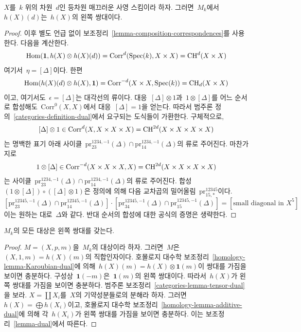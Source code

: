 \begin{lemma}
\label{lemma-dual}
$X$를\  $k$ 위의 차원\  $d$인 등차원 매끄러운 사영 스킴이라 하자.
그러면\  $M_k$에서\  $h(X)(d)$는\  $h(X)$의 왼쪽 쌍대이다.
\end{lemma}

\begin{proof}
이후 별도 언급 없이 보조정리\ 
\ref{lemma-composition-correspondences}를 사용한다. 다음을 계산한다.
$$
\mathop{\mathrm{Hom}}\nolimits(\mathbf{1}, h(X) \otimes h(X)(d)) =
\text{Corr}^d(\mathop{\mathrm{Spec}}(k), X \times X) = \mathop{\mathrm{CH}}\nolimits^d(X \times X)
$$
여기서\  $\eta = [\Delta]$이다. 한편
$$
\mathop{\mathrm{Hom}}\nolimits(h(X)(d) \otimes h(X), \mathbf{1}) =
\text{Corr}^{-d}(X \times X, \mathop{\mathrm{Spec}}(k)) = \mathop{\mathrm{CH}}\nolimits_d(X \times X)
$$
이고, 여기서도\  $\epsilon = [\Delta]$는 대각선의 류이다.
대응\  $[\Delta] \otimes 1$과\  $1 \otimes [\Delta]$를 어느 순서로
합성해도\  $\text{Corr}^0(X, X)$에서 대응\  $[\Delta] = 1$을 얻는다.
따라서 범주론 정의\  \ref{categories-definition-dual}에서 요구되는
도식들이 가환한다. 구체적으로,
$$
[\Delta] \otimes 1 \in \text{Corr}^d(X, X \times X \times X) =
\mathop{\mathrm{CH}}\nolimits^{2d}(X \times X \times X \times X)
$$
는 명백한 표기 아래 사이클\ 
$\text{pr}^{1234, -1}_{23}(\Delta) \cap \text{pr}^{1234, -1}_{14}(\Delta)$의
류로 주어진다. 마찬가지로
$$
1 \otimes [\Delta] \in \text{Corr}^{-d}(X \times X \times X, X) =
\mathop{\mathrm{CH}}\nolimits^{2d}(X \times X \times X \times X)
$$
는 사이클\ 
$\text{pr}^{1234, -1}_{23}(\Delta) \cap \text{pr}^{1234, -1}_{14}(\Delta)$의
류로 주어진다. 합성\ 
$(1 \otimes [\Delta]) \circ ([\Delta] \otimes 1)$은 정의에 의해
다음 교차곱의 밀어올림\  $\text{pr}^{12345}_{15, *}$이다.
$$
[\text{pr}^{12345, -1}_{23}(\Delta) \cap \text{pr}^{12345, -1}_{14}(\Delta)]
\cdot
[\text{pr}^{12345, -1}_{34}(\Delta) \cap \text{pr}^{12345, -1}_{15}(\Delta)]
=
[\text{small diagonal in } X^5]
$$
이는 원하는 대로\  $\Delta$와 같다. 반대 순서의 합성에 대한 공식의
증명은 생략한다.
\end{proof}

\begin{lemma}
\label{lemma-dual-general}
$M_k$의 모든 대상은 왼쪽 쌍대를 갖는다.
\end{lemma}

\begin{proof}
$M = (X, p, m)$을\  $M_k$의 대상이라 하자. 그러면\  $M$은\ 
$(X, 1, m) = h(X)(m)$의 직합인자이다. 호몰로지 대수학 보조정리\ 
\ref{homology-lemma-Karoubian-dual}에 의해\ 
$h(X)(m) = h(X) \otimes \mathbf{1}(m)$이 쌍대를 가짐을 보이면 충분하다.
구성상\  $\mathbf{1}(-m)$은\  $\mathbf{1}(m)$의 왼쪽 쌍대이다.
따라서\  $h(X)$가 왼쪽 쌍대를 가짐을 보이면 충분하다. 범주론 보조정리\ 
\ref{categories-lemma-tensor-dual}을 보라.
$X = \coprod X_i$를\  $X$의 기약성분들로의 분해라 하자.
그러면\  $h(X) = \bigoplus h(X_i)$이고, 호몰로지 대수학 보조정리\ 
\ref{homology-lemma-additive-dual}에 의해 각\  $h(X_i)$가 왼쪽
쌍대를 가짐을 보이면 충분하다. 이는 보조정리\  \ref{lemma-dual}에서 따른다.
\end{proof}






